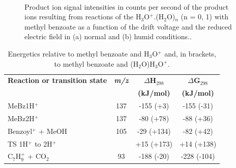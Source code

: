 \begin{figure}[htbp]
\centering
{}\\
\caption{Product ion signal intensities in counts per second of the product ions resulting from reactions of the H$_3$O$^+$.(H$_2$O)$_n$ (n = 0, 1) with methyl benzoate as a function of the drift voltage and the reduced electric field in (a) normal and (b) humid conditions..}
\label{fig:MeBzEN}
\end{figure}

\begin{table}[htbp]
\centering
\caption{Energetics relative to methyl benzoate and H$_3$O$^+$ and, in brackets, to methyl benzoate and (H$_2$O)H$_3$O$^+$. }
\label{tb:mb2}
\begin{tabular}{lccc}
\toprule
\textbf{Reaction or transition state}	&\textbf{\textit{m/z} } &\textbf{$\Delta$H$_{298}$} &\textbf{$\Delta$G$_{298}$}\\
& &	\textbf{(kJ/mol)} &\textbf{(kJ/mol)} \\  \toprule
MeBz1H$^+$   					&	137	& -155 (+3)  & -155 (-31)   \\ \midrule
MeBz2H$^+$ 						&	137	& -80 (+78)  & -88 (+36)    \\ \midrule
Benzoyl$^+$ + MeOH				&	105	& -29 (+134)  & -82 (+42)   \\ \midrule
TS 1H$^+$ to 2H$^+$                     &		& +15 (+173)  	& +14 (+138)\\ \midrule
C$_7$H$_9^+$ + CO$_2$           &   93  &   -188 (-20) & -228 (-104) \\
\bottomrule
\end{tabular}
\end{table}


